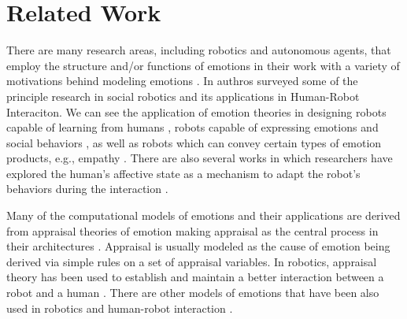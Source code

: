 \documentclass{sig-alternate-05-2015}
\begin{document}

\section{Related Work}

There are many research areas, including robotics and autonomous agents, that
employ the structure and/or functions of emotions in their work with a variety
of motivations behind modeling emotions
\cite{wehrle:motivations-modeling-emotion}. In
\cite{breazeal:sociable-interactive-robots} authros surveyed some of the
principle research in social robotics and its applications in Human-Robot
Interaciton. We can see the application of emotion theories in designing robots
capable of learning from humans \cite{breazeal:expressive-behavior}, robots
capable of expressing emotions \cite{cameron:expression-hri}
\cite{shayganfar:methodology} and social behaviors
\cite{paiva:emotion-modeling}, as well as robots which can convey certain types
of emotion products, e.g., empathy \cite{leite:empathy-hri}. There are also
several works in which researchers have explored the human's affective state as
a mechanism to adapt the robot's behaviors during the interaction
\cite{breazeal:sociable-robot} \cite{liu:affect-robot-behavior}.

Many of the computational models of emotions and their applications are derived
from appraisal theories of emotion making appraisal as the central process in
their architectures \cite{adam:bdi-emotional-companion}
\cite{marinier:behavior-emotion} \cite{marsella:ema-process-model}
\cite{si:modeling-appraisal-tom-journal}. Appraisal is usually modeled as the
cause of emotion being derived via simple rules on a set of appraisal variables.
In robotics, appraisal theory has been used to establish and maintain a better
interaction between a robot and a human \cite{castro:autonomous-robot-fear}
\cite{kim:model-hri-appraisal} \cite{pontier:women-robot-men}
\cite{vogiatzis:robot-museum}. There are other models of emotions that have been
also used in robotics and human-robot interaction \cite{klug:emotion-based-hri}
\cite{lim:mei-motherese-ei} \cite{zhang:service-robot-dimensional}.
\end{document}
